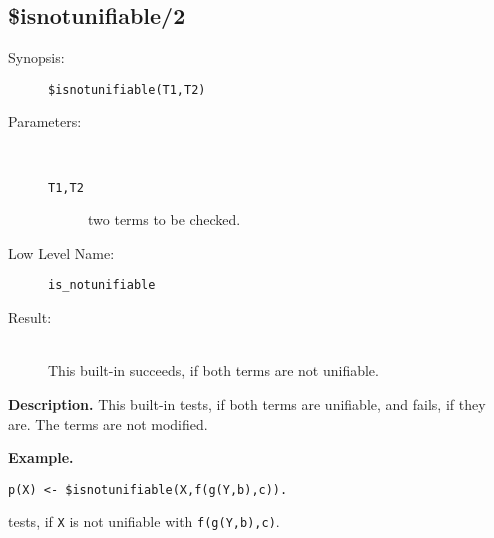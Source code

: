 %
%
%
\subsection{\$isnotunifiable/2}

\begin{description}
\item[Synopsis:]
	{\tt \$isnotunifiable(T1,T2)}
\item[Parameters:]\ \\[-0.5cm]
	\begin{description}
	\item[{\tt T1,T2}]
two terms to be checked.
	\end{description}
\item[Low Level Name:]
	{\tt is\_notunifiable}
\item[Result:]\ \\
This built-in succeeds, if both terms are not unifiable.
\end{description}

\vspace*{0.5cm}
\noindent
{\bf Description.}
This built-in tests, if both terms are unifiable, and fails, if they are. 
The terms are not modified.

\vspace*{0.5cm}
\noindent
{\bf Example.}
\begin{verbatim}
p(X) <- $isnotunifiable(X,f(g(Y,b),c)).
\end{verbatim}
tests, if  {\tt X} is not unifiable with {\tt f(g(Y,b),c)}.
 



